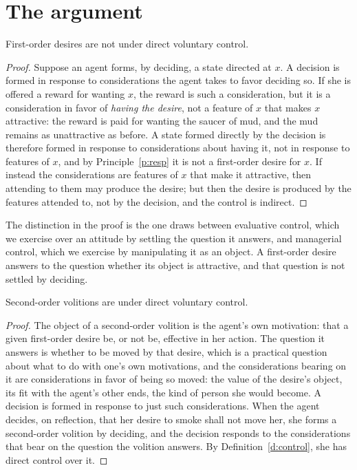 \documentclass{situationist-preprint}
\begin{document}
\section{The argument}

\begin{lemma}\label{l:first}
First-order desires are not under direct voluntary control.
\end{lemma}

\begin{proof}
Suppose an agent forms, by deciding, a state directed at $x$. A decision is formed in response to considerations the agent takes to favor deciding so. If she is offered a reward for wanting $x$, the reward is such a consideration, but it is a consideration in favor of \emph{having the desire}, not a feature of $x$ that makes $x$ attractive: the reward is paid for wanting the saucer of mud, and the mud remains as unattractive as before. A state formed directly by the decision is therefore formed in response to considerations about having it, not in response to features of $x$, and by Principle~\ref{p:resp} it is not a first-order desire for $x$. If instead the considerations are features of $x$ that make it attractive, then attending to them may produce the desire; but then the desire is produced by the features attended to, not by the decision, and the control is indirect.
\end{proof}

The distinction in the proof is the one \citet{Hieronymi2006} draws between evaluative control, which we exercise over an attitude by settling the question it answers, and managerial control, which we exercise by manipulating it as an object. A first-order desire answers to the question whether its object is attractive, and that question is not settled by deciding.

\begin{lemma}\label{l:second}
Second-order volitions are under direct voluntary control.
\end{lemma}

\begin{proof}
The object of a second-order volition is the agent's own motivation: that a given first-order desire be, or not be, effective in her action. The question it answers is whether to be moved by that desire, which is a practical question about what to do with one's own motivations, and the considerations bearing on it are considerations in favor of being so moved: the value of the desire's object, its fit with the agent's other ends, the kind of person she would become. A decision is formed in response to just such considerations. When the agent decides, on reflection, that her desire to smoke shall not move her, she forms a second-order volition by deciding, and the decision responds to the considerations that bear on the question the volition answers. By Definition~\ref{d:control}, she has direct control over it.
\end{proof}
\end{document}
